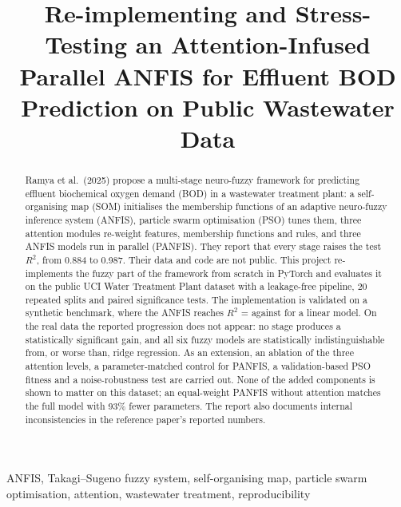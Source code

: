 \documentclass[conference]{IEEEtran}
\newcommand{\Rsq}{$R^2$}
\begin{document}
\title{Re-implementing and Stress-Testing an Attention-Infused Parallel ANFIS for Effluent BOD Prediction on Public Wastewater Data}

\author{
}

\maketitle

\begin{abstract}
Ramya et al.\ (2025) propose a multi-stage neuro-fuzzy framework for predicting effluent biochemical oxygen demand (BOD) in a wastewater treatment plant: a self-organising map (SOM) initialises the membership functions of an adaptive neuro-fuzzy inference system (ANFIS), particle swarm optimisation (PSO) tunes them, three attention modules re-weight features, membership functions and rules, and three ANFIS models run in parallel (PANFIS). They report that every stage raises the test \Rsq{}, from 0.884 to 0.987. Their data and code are not public. This project re-implements the fuzzy part of the framework from scratch in PyTorch and evaluates it on the public UCI Water Treatment Plant dataset with a leakage-free pipeline, 20 repeated splits and paired significance tests. The implementation is validated on a synthetic benchmark, where the ANFIS reaches \Rsq{} = \factsanityanfis{} against \factsanityridge{} for a linear model. On the real data the reported progression does not appear: no stage produces a statistically significant gain, and all six fuzzy models are statistically indistinguishable from, or worse than, ridge regression. As an extension, an ablation of the three attention levels, a parameter-matched control for PANFIS, a validation-based PSO fitness and a noise-robustness test are carried out. None of the added components is shown to matter on this dataset; an equal-weight PANFIS without attention matches the full model with 93\% fewer parameters. The report also documents internal inconsistencies in the reference paper's reported numbers.
\end{abstract}

\begin{IEEEkeywords}
ANFIS, Takagi--Sugeno fuzzy system, self-organising map, particle swarm optimisation, attention, wastewater treatment, reproducibility
\end{IEEEkeywords}
\end{document}
